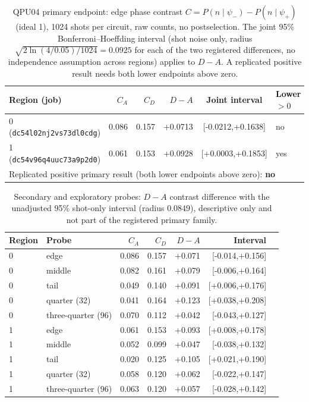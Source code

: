 \begin{table}[htbp]\centering\small
\caption{QPU04 primary endpoint: edge phase contrast $C=P(n\mid\psi_-)-P(n\mid\psi_+)$ (ideal 1), 1024 shots per circuit, raw counts, no postselection. The joint 95\% Bonferroni--Hoeffding interval (shot noise only, radius $\sqrt{2\ln(4/0.05)/1024}=0.0925$ for each of the two registered differences, no independence assumption across regions) applies to $D-A$. A replicated positive result needs both lower endpoints above zero.}\label{tab:q4-primary}
\begin{tabular}{lrrrcl}\toprule Region (job) & $C_A$ & $C_D$ & $D-A$ & Joint interval & Lower $>0$\\\midrule
0 (\texttt{dc54l02nj2vs73dl0cdg}) & 0.086 & 0.157 & +0.0713 & [-0.0212,+0.1638] & no\\
1 (\texttt{dc54v96q4uuc73a9p2d0}) & 0.061 & 0.153 & +0.0928 & [+0.0003,+0.1853] & yes\\
\midrule
\multicolumn{6}{l}{Replicated positive primary result (both lower endpoints above zero): \textbf{no}}\\
\bottomrule\end{tabular}\end{table}

\begin{table}[htbp]\centering\small
\caption{Secondary and exploratory probes: $D-A$ contrast difference with the unadjusted 95\% shot-only interval (radius $0.0849$), descriptive only and not part of the registered primary family.}\label{tab:q4-secondary}
\begin{tabular}{llrrrrr}\toprule Region & Probe & $C_A$ & $C_D$ & $D-A$ & Interval & \\\midrule
0 & edge & 0.086 & 0.157 & +0.071 & [-0.014,+0.156] & \\
0 & middle & 0.082 & 0.161 & +0.079 & [-0.006,+0.164] & \\
0 & tail & 0.049 & 0.140 & +0.091 & [+0.006,+0.176] & \\
0 & quarter (32) & 0.041 & 0.164 & +0.123 & [+0.038,+0.208] & \\
0 & three-quarter (96) & 0.070 & 0.112 & +0.042 & [-0.043,+0.127] & \\
\midrule
1 & edge & 0.061 & 0.153 & +0.093 & [+0.008,+0.178] & \\
1 & middle & 0.052 & 0.099 & +0.047 & [-0.038,+0.132] & \\
1 & tail & 0.020 & 0.125 & +0.105 & [+0.021,+0.190] & \\
1 & quarter (32) & 0.058 & 0.120 & +0.062 & [-0.022,+0.147] & \\
1 & three-quarter (96) & 0.063 & 0.120 & +0.057 & [-0.028,+0.142] & \\

\bottomrule\end{tabular}\end{table}

